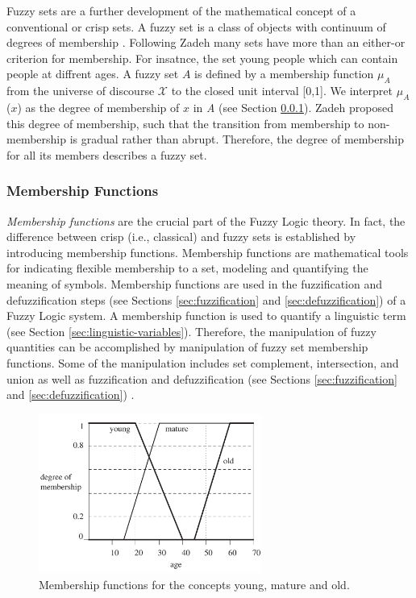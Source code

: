 \documentclass[11pt]{article}
\begin{document}
Fuzzy sets are a further development of the mathematical concept of a
conventional or crisp sets. A fuzzy set is a class of objects with continuum of
degrees of membership \cite{zadeh:fuzzy}. Following Zadeh \cite{zadeh:fuzzy}
many sets have more than an either-or criterion for membership. For insatnce,
the set young people which can contain people at diffrent ages. A fuzzy set
$\textit{A}$ is defined by a membership function $\mu_A$ from the universe of
discourse $\mathcal{X}$ to the closed unit interval [0,1]. We interpret
$\mu_A$($\textit{x}$) as the degree of membership of $\textit{x}$ in \textit{A}
(see Section \ref{sec:membership-function}). Zadeh proposed this degree of
membership, such that the transition from membership to non-membership is
gradual rather than abrupt. Therefore, the degree of membership for all its
members describes a fuzzy set.

\subsubsection{Membership Functions}
\label{sec:membership-function}

\textit{Membership functions} are the crucial part of the Fuzzy Logic theory. In
fact, the difference between crisp (i.e., classical) and fuzzy sets is
established by introducing membership functions. Membership functions are
mathematical tools for indicating flexible membership to a set, modeling and
quantifying the meaning of symbols. Membership functions are used in the
fuzzification and defuzzification steps (see Sections \ref{sec:fuzzification}
and \ref{sec:defuzzification}) of a Fuzzy Logic system. A membership function is
used to quantify a linguistic term (see Section \ref{sec:linguistic-variables}).
Therefore, the manipulation of fuzzy quantities can be accomplished by
manipulation of fuzzy set membership functions. Some of the manipulation
includes set complement, intersection, and union as well as fuzzification and
defuzzification (see Sections \ref{sec:fuzzification} and
\ref{sec:defuzzification}) \cite{schalkoff:intelligent-systems}.

\begin{figure}[tbh]
  \center
  \includegraphics[width=0.65\textwidth]{figure/membership-function.png}
  \caption{Membership functions for the concepts young, mature and old.}
  \label{fig:membership-function}
\end{figure}
\end{document}
